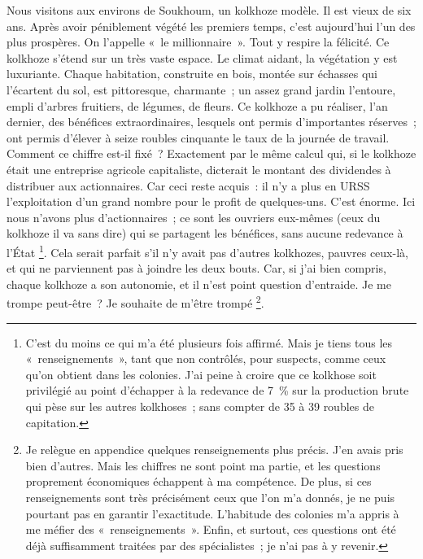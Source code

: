 \documentclass[twoside]{book} %
\begin{document}
Nous visitons aux environs de Soukhoum, un kolkhoze modèle. Il est vieux de six ans. Après avoir péniblement végété les premiers temps, c’est aujourd’hui l’un des plus prospères. On l’appelle « le millionnaire ». Tout y respire la félicité. Ce kolkhoze s’étend sur un très vaste espace. Le climat aidant, la végétation y est luxuriante. Chaque habitation, construite en bois, montée sur échasses qui l’écartent du sol, est pittoresque, charmante ; un assez grand jardin l’entoure, empli d’arbres fruitiers, de légumes, de fleurs. Ce kolkhoze a pu réaliser, l’an dernier, des bénéfices extraordinaires, lesquels ont permis d’importantes réserves ; ont permis d’élever à seize roubles cinquante le taux de la journée de travail. Comment ce chiffre est-il fixé ? Exactement par le même calcul qui, si le kolkhoze était une entreprise agricole capitaliste, dicterait le montant des dividendes à distribuer aux actionnaires. Car ceci reste acquis : il n’y a plus en URSS l’exploitation d’un grand nombre pour le profit de quelques-uns. C’est énorme. Ici nous n’avons plus d’actionnaires ; ce sont les ouvriers eux-mêmes (ceux du kolkhoze il va sans dire) qui se partagent les bénéfices, sans aucune redevance à l’État \footnote{C’est du moins ce qui m’a été plusieurs fois affirmé. Mais je tiens tous les « renseignements », tant que non contrôlés, pour suspects, comme ceux qu’on obtient dans les colonies. J’ai peine à croire que ce kolkhose soit privilégié au point d’échapper à la redevance de 7 \% sur la production brute qui pèse sur les autres kolkhoses ; sans compter de 35 à 39 roubles de capitation.}. Cela serait parfait s’il n’y avait pas d’autres kolkhozes, pauvres ceux-là, et qui ne parviennent pas à joindre les deux bouts. Car, si j’ai bien compris, chaque kolkhoze a son autonomie, et il n’est point question d’entraide. Je me trompe peut-être ? Je souhaite de m’être trompé \footnote{Je relègue en appendice quelques renseignements plus précis. J’en avais pris bien d’autres. Mais les chiffres ne sont point ma partie, et les questions proprement économiques échappent à ma compétence. De plus, si ces renseignements sont très précisément ceux que l’on m’a donnés, je ne puis pourtant pas en garantir l’exactitude. L’habitude des colonies m’a appris à me méfier des « renseignements ». Enfin, et surtout, ces questions ont été déjà suffisamment traitées par des spécialistes ; je n’ai pas à y revenir.}.\par
\end{document}
